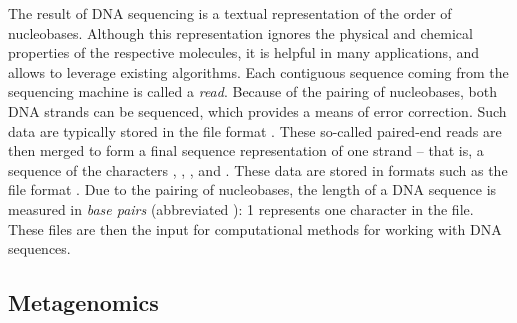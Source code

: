 The result of DNA sequencing is a textual representation of the order of nucleobases.
Although this representation ignores the physical and chemical properties of the respective molecules,
it is helpful in many applications, and allows to leverage existing algorithms.
Each contiguous sequence coming from the sequencing machine is called a \emph{read}.
Because of the pairing of nucleobases,
both DNA strands can be sequenced, which provides a means of error correction.
Such data are typically stored in the  file format \citep{Cock2009}.
These so-called paired-end reads are then merged to form a final sequence representation of one strand
-- that is, a sequence of the characters , , , and .
These data are stored in formats such as the  file format \citep{Pearson1988}.
Due to the pairing of nucleobases,
the length of a DNA sequence is measured in \emph{base pairs} (abbreviated \si{\basepair}):
\SI{1}{\basepair} represents one character in the file.
These files are then the input for computational methods for working with DNA sequences.



\subsection{Metagenomics}
\label{ch:Foundations:sec:SequenceAnalysis:sub:Metagenomics}


